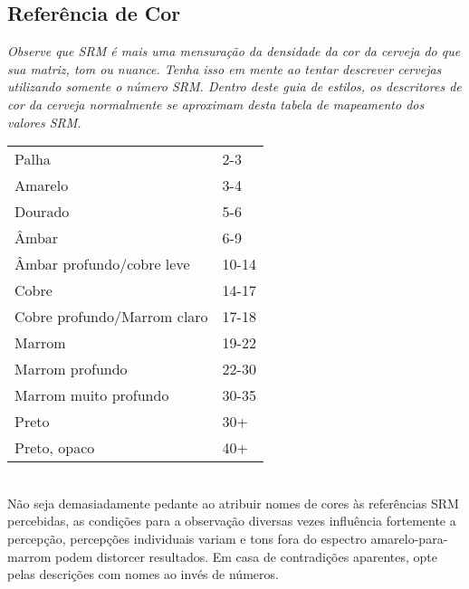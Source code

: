 \subsection*{Referência de Cor}

\textit{Observe que SRM é mais uma mensuração da densidade da cor da cerveja do que sua matriz, tom ou nuance. Tenha isso em mente ao tentar descrever cervejas utilizando somente o número SRM. Dentro deste guia de estilos, os descritores de cor da cerveja normalmente se aproximam desta tabela de mapeamento dos valores SRM.}\\

\begin{tabular}{ l l }
Palha & 2-3 \\
Amarelo & 3-4 \\
Dourado & 5-6 \\
Âmbar & 6-9 \\
Âmbar profundo/cobre leve & 10-14 \\
Cobre & 14-17 \\
Cobre profundo/Marrom claro & 17-18 \\
Marrom & 19-22 \\
Marrom profundo & 22-30 \\
Marrom muito profundo & 30-35 \\
Preto & 30+ \\
Preto, opaco & 40+
\end{tabular}\\

Não seja demasiadamente pedante ao atribuir nomes de cores às referências SRM percebidas, as condições para a observação diversas vezes influência fortemente a percepção, percepções individuais variam e tons fora do espectro amarelo-para-marrom podem distorcer resultados. Em casa de contradições aparentes, opte pelas descrições com nomes ao invés de números.
